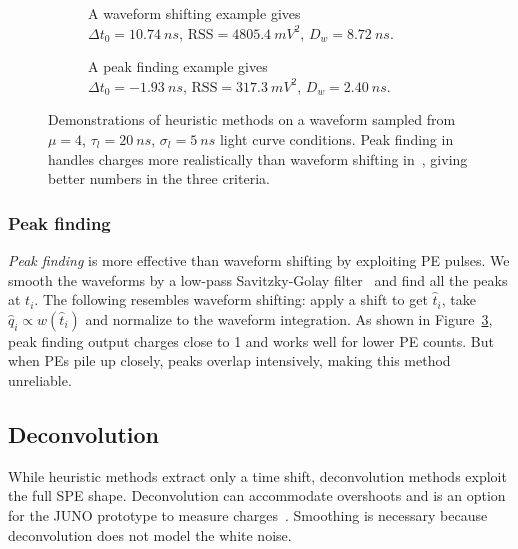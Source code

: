 \begin{figure}[H]
  \begin{subfigure}{.5\textwidth}
    \centering
    \resizebox{\textwidth}{!}{}
    \caption{\label{fig:shifting} A waveform shifting example gives \\ $\Delta t_0=\SI{10.74}{ns}$, $\mathrm{RSS}=\SI{4805.4}{mV^2}$, $D_w=\SI{8.72}{ns}$.}
  \end{subfigure}
  \begin{subfigure}{.5\textwidth}
    \centering
    \resizebox{\textwidth}{!}{}
    \caption{\label{fig:peak} A peak finding example gives \\ $\Delta t_0=\SI{-1.93}{ns}$, $\mathrm{RSS}=\SI{317.3}{mV^2}$, $D_w=\SI{2.40}{ns}$.}
  \end{subfigure}
  \caption{Demonstrations of heuristic methods on a waveform sampled from $\mu=4$, $\tau_l=\SI{20}{ns}$, $\sigma_l=\SI{5}{ns}$ light curve conditions.  Peak finding in~ handles charges more realistically than waveform shifting in~, giving better numbers in the three criteria.}
\end{figure}

\subsubsection{Peak finding}
\label{sec:findpeak}

\textit{Peak finding} is more effective than waveform shifting by exploiting PE pulses.  We smooth the waveforms by a low-pass Savitzky-Golay filter~\cite{savitzky_smoothing_1964} and find all the peaks at $t_i$.  The following resembles waveform shifting: apply a shift to get $\hat{t}_i$, take $\hat{q}_i \propto w(\hat{t}_i)$ and normalize to the waveform integration. As shown in Figure~\ref{fig:peak}, peak finding output charges close to 1 and works well for lower PE counts.  But when PEs pile up closely, peaks overlap intensively, making this method unreliable.

\subsection{Deconvolution}
\label{sec:deconv}
While heuristic methods extract only a time shift, deconvolution methods exploit the full SPE shape. Deconvolution can accommodate overshoots and is an option for the JUNO prototype to measure charges~\cite{zhang_comparison_2019}. Smoothing is necessary because deconvolution does not model the white noise. 

